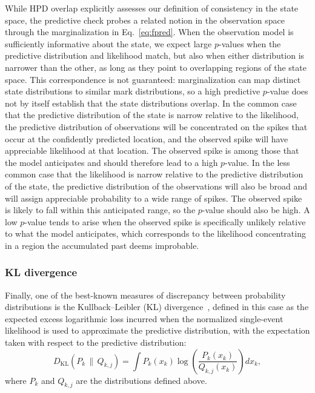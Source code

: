 \documentclass[12pt]{article}
\begin{document}
While HPD overlap explicitly assesses our definition of consistency in the state space, the predictive check probes a related notion in the observation space through the marginalization in Eq.~\eqref{eq:fpred}. When the observation model is sufficiently informative about the state, we expect large $p$-values when the predictive distribution and likelihood match, but also when either distribution is narrower than the other, as long as they point to overlapping regions of the state space. This correspondence is not guaranteed: marginalization can map distinct state distributions to similar mark distributions, so a high predictive $p$-value does not by itself establish that the state distributions overlap. In the common case that the predictive distribution of the state is narrow relative to the likelihood, the predictive distribution of observations will be concentrated on the spikes that occur at the confidently predicted location, and the observed spike will have appreciable likelihood at that location. The observed spike is among those that the model anticipates and should therefore lead to a high $p$-value. In the less common case that the likelihood is narrow relative to the predictive distribution of the state, the predictive distribution of the observations will also be broad and will assign appreciable probability to a wide range of spikes. The observed spike is likely to fall within this anticipated range, so the $p$-value should also be high. A low $p$-value tends to arise when the observed spike is specifically unlikely relative to what the model anticipates, which corresponds to the likelihood concentrating in a region the accumulated past deems improbable.

\subsubsection*{KL divergence}\label{sec:kl}

Finally, one of the best-known measures of discrepancy between probability distributions is the Kullback--Leibler (KL) divergence~\cite{kullbackInformationSufficiency1951}, defined in this case as the expected excess logarithmic loss incurred when the normalized single-event likelihood is used to approximate the predictive distribution, with the expectation taken with respect to the predictive distribution:
\begin{equation}
    \label{eq:kl}
    D_{\mathrm{KL}}(P_k \,\|\, Q_{k,j}) = \int P_k(x_k) \log \!\left(\frac{P_k(x_k)}{Q_{k,j}(x_k)}\right) dx_k,
\end{equation}
where $P_k$ and $Q_{k,j}$ are the distributions defined above.
\end{document}
